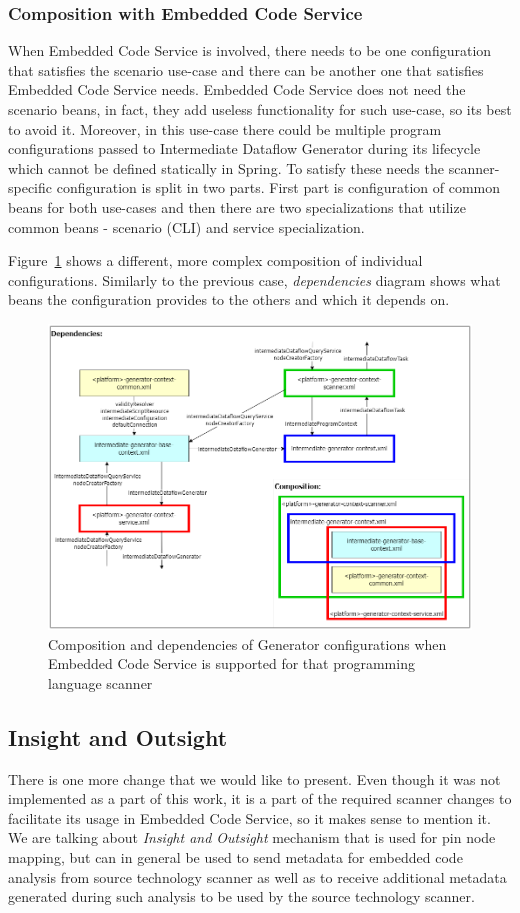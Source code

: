\subsubsection{Composition with Embedded Code Service}
When Embedded Code Service is involved, there needs to be one configuration that satisfies the scenario use-case and there can be another one that satisfies Embedded Code Service needs. Embedded Code Service does not need the scenario beans, in fact, they add useless functionality for such use-case, so its best to avoid it. Moreover, in this use-case there could be multiple program configurations passed to Intermediate Dataflow Generator during its lifecycle which cannot be defined statically in Spring. To satisfy these needs the scanner-specific configuration is split in two parts. First part is configuration of common beans for both use-cases and then there are two specializations that utilize common beans - scenario (CLI) and service specialization.
\par
Figure~\ref{fig:generatorECS} shows a different, more complex composition of individual configurations. Similarly to the previous case, \textit{dependencies} diagram shows what beans the configuration provides to the others and which it depends on.
\begin{figure}[ht]\centering
\includegraphics[width=1.0\textwidth]{img/generator_ECS.png}
\caption{Composition and dependencies of Generator configurations when Embedded Code Service is supported for that programming language scanner}
\label{fig:generatorECS}
\end{figure}

\subsection{Insight and Outsight}
There is one more change that we would like to present. Even though it was not implemented as a part of this work, it is a part of the required scanner changes to facilitate its usage in Embedded Code Service, so it makes sense to mention it. We are talking about \textit {Insight and Outsight} mechanism that is used for pin node mapping, but can in general be used to send metadata for embedded code analysis from source technology scanner as well as to receive additional metadata generated during such analysis to be used by the source technology scanner.

